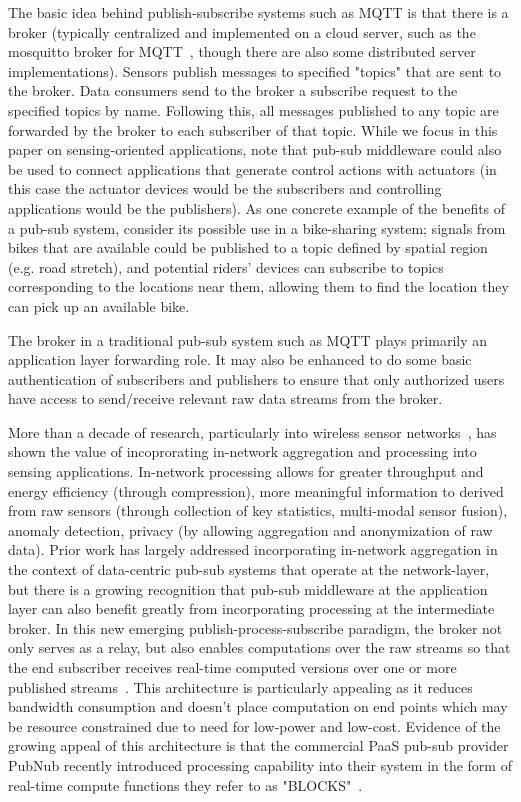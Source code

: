 The basic idea behind publish-subscribe systems such as MQTT is that there is a broker (typically centralized and implemented on a cloud server, such as the mosquitto broker for MQTT~\cite{}, though there are also some distributed server implementations). Sensors publish messages to specified "topics" that are sent to the broker. Data consumers send to the broker a subscribe request to the specified topics by name. Following this, all messages published to any topic are forwarded by the broker to each subscriber of that topic. While we focus in this paper on sensing-oriented applications, note that pub-sub middleware could also be used to connect applications that generate control actions with actuators (in this case the actuator devices would be the subscribers and controlling applications would be the publishers). As one concrete example of the benefits of a pub-sub system, consider its possible use in a bike-sharing system; signals from bikes that are available could be published to a topic defined by spatial region (e.g. road stretch), and potential riders' devices can subscribe to topics corresponding to the locations near them, allowing them to find the location they can pick up an available bike. 

The broker in a traditional pub-sub system such as MQTT plays primarily an application layer forwarding role. It may also be enhanced to do some basic authentication of subscribers and publishers to ensure that only authorized users have access to send/receive relevant raw data streams from the broker. 

More than a decade of research, particularly into  wireless sensor networks~\cite{}, has shown the value of incoprorating in-network aggregation and processing into sensing applications.  In-network processing allows for greater throughput and energy efficiency (through compression), more meaningful information to derived from raw sensors (through collection of key statistics, multi-modal sensor fusion), anomaly detection, privacy (by allowing aggregation and anonymization of raw data). Prior work has largely addressed incorporating in-network aggregation in the context of data-centric pub-sub systems that operate at the network-layer, but there is a growing recognition that pub-sub middleware at the application layer can also benefit greatly from incorporating processing at the intermediate broker. In this new emerging  publish-process-subscribe paradigm, the broker not only serves as a relay, but also enables computations over the 
raw streams so that the end subscriber receives real-time computed versions over one or more published streams~\cite{}. This architecture is particularly appealing as it reduces bandwidth consumption and doesn't place computation on end points which may be resource constrained due to need for low-power and low-cost. Evidence of the growing appeal of this architecture is that the commercial PaaS pub-sub provider PubNub recently introduced processing capability into their system in the form of real-time compute functions they refer to as "BLOCKS"~\cite{}.

